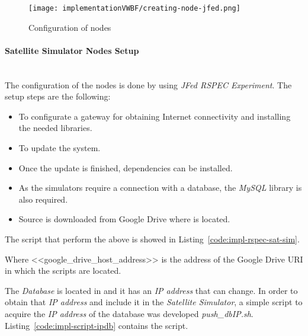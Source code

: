 \begin{figure}[!h]
\begin{center}
\texttt{[image: implementationVWBF/creating-node-jfed.png]}

\caption{Configuration of \vw nodes}
\label{fig:creating-node-jfed}
\end{center}
\end{figure}


\paragraph{Satellite Simulator Nodes Setup}~\\
The configuration of the nodes is done by using \emph{JFed RSPEC Experiment}. The
setup steps are the following:
\begin{itemize}
\item To configurate a gateway for obtaining Internet connectivity and installing the
  needed libraries.
\item To update the system.
\item Once the update is finished, dependencies can be installed.
\item As the simulators require a connection with a database, the \emph{MySQL} library is
  also required. 
\item Source is downloaded from Google Drive where is located.
\end{itemize}

The script that perform the above is showed in Listing~\ref{code:impl-rspec-sat-sim}.





Where <<google\_drive\_host\_address>> is the address of the Google Drive URI in which the scripts are located.

The \emph{Database} is located in \bonfire and it has an \emph{IP address} that can change. In order to
obtain that \emph{IP address} and include it in the \emph{Satellite Simulator}, a simple script to
acquire the \emph{IP address} of the database was developed \emph{push\_dbIP.sh}.
Listing~\ref{code:impl-script-ipdb} contains the script.




